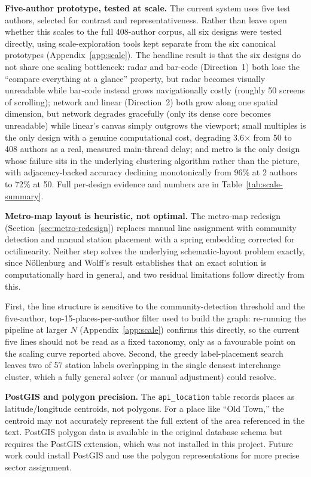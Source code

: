 \documentclass[logo,msc]{infthesis}
\begin{document}
\textbf{Five-author prototype, tested at scale.} The current system uses five test authors, selected for contrast and representativeness. Rather than leave open whether this scales to the full 408-author corpus, all six designs were tested directly, using scale-exploration tools kept separate from the six canonical prototypes (Appendix~\ref{app:scale}). The headline result is that the six designs do not share one scaling bottleneck: radar and bar-code (Direction~1) both lose the ``compare everything at a glance'' property, but radar becomes visually unreadable while bar-code instead grows navigationally costly (roughly 50 screens of scrolling); network and linear (Direction~2) both grow along one spatial dimension, but network degrades gracefully (only its dense core becomes unreadable) while linear's canvas simply outgrows the viewport; small multiples is the only design with a genuine computational cost, degrading 3.6$\times$ from 50 to 408 authors as a real, measured main-thread delay; and metro is the only design whose failure sits in the underlying clustering algorithm rather than the picture, with adjacency-backed accuracy declining monotonically from 96\% at 2 authors to 72\% at 50. Full per-design evidence and numbers are in Table~\ref{tab:scale-summary}.
 
\textbf{Metro-map layout is heuristic, not optimal.} The metro-map redesign (Section~\ref{sec:metro-redesign}) replaces manual line assignment with community detection and manual station placement with a spring embedding corrected for octilinearity. Neither step solves the underlying schematic-layout problem exactly, since N{\"o}llenburg and Wolff's result \cite{nollenburg2011} establishes that an exact solution is computationally hard in general, and two residual limitations follow directly from this.

First, the line structure is sensitive to the community-detection threshold and the five-author, top-15-places-per-author filter used to build the graph: re-running the pipeline at larger $N$ (Appendix~\ref{app:scale}) confirms this directly, so the current five lines should not be read as a fixed taxonomy, only as a favourable point on the scaling curve reported above. Second, the greedy label-placement search leaves two of 57 station labels overlapping in the single densest interchange cluster, which a fully general solver (or manual adjustment) could resolve.

\textbf{PostGIS and polygon precision.} The \texttt{api\_location} table records places as latitude/longitude centroids, not polygons. For a place like ``Old Town,'' the centroid may not accurately represent the full extent of the area referenced in the text. PostGIS polygon data is available in the original database schema but requires the PostGIS extension, which was not installed in this project. Future work could install PostGIS and use the polygon representations for more precise sector assignment.
 
\end{document}
